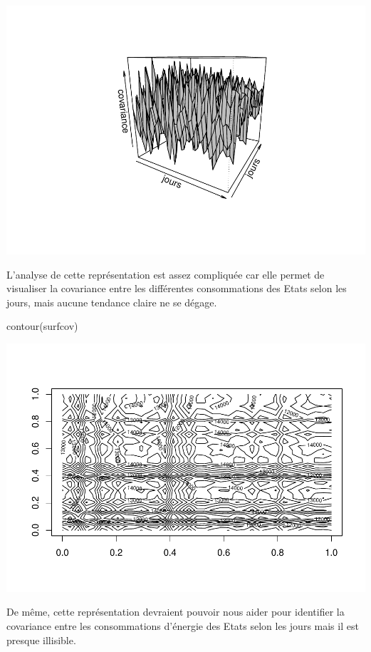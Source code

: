 \documentclass[
]{article}
\newenvironment{Shaded}{\begin{snugshade}}{\end{snugshade}}
\newcommand{\FunctionTok}[1]{\textcolor[rgb]{0.00,0.00,0.00}{#1}}
\newcommand{\NormalTok}[1]{#1}
\begin{document}
\includegraphics{Projet_CHESNAIS_GUIBERT_files/figure-latex/unnamed-chunk-38-1.pdf}

L'analyse de cette représentation est assez compliquée car elle permet
de visualiser la covariance entre les différentes consommations des
Etats selon les jours, mais aucune tendance claire ne se dégage.

\begin{Shaded}
\begin{Highlighting}[]
\FunctionTok{contour}\NormalTok{(surfcov)}
\end{Highlighting}
\end{Shaded}

\includegraphics{Projet_CHESNAIS_GUIBERT_files/figure-latex/unnamed-chunk-39-1.pdf}

De même, cette représentation devraient pouvoir nous aider pour
identifier la covariance entre les consommations d'énergie des Etats
selon les jours mais il est presque illisible.
\end{document}
